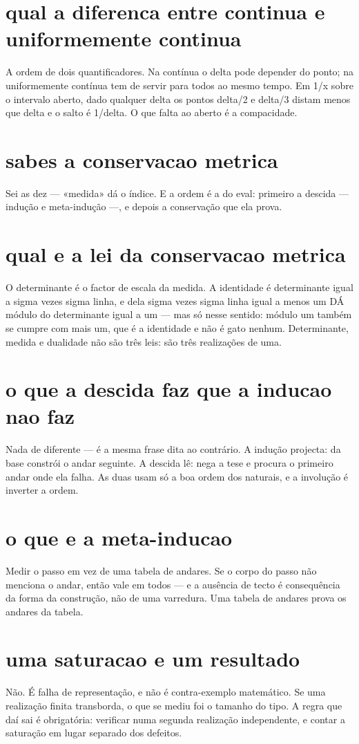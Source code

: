 \documentclass[11pt,a4paper]{article}
\begin{document}
\section{qual a diferenca entre continua e uniformemente continua}
A ordem de dois quantificadores. Na contínua o delta pode depender do ponto; na
uniformemente contínua tem de servir para todos ao mesmo tempo. Em 1/x sobre o intervalo
aberto, dado qualquer delta os pontos delta/2 e delta/3 distam menos que delta e o salto
é 1/delta. O que falta ao aberto é a compacidade.

\section{sabes a conservacao metrica}
Sei as dez — «medida» dá o índice. E a ordem é a do eval: primeiro a descida — indução e
meta-indução —, e depois a conservação que ela prova.

\section{qual e a lei da conservacao metrica}
O determinante é o factor de escala da medida. A identidade é determinante igual a sigma
vezes sigma linha, e dela sigma vezes sigma linha igual a menos um DÁ módulo do
determinante igual a um — mas só nesse sentido: módulo um também se cumpre com mais um,
que é a identidade e não é gato nenhum. Determinante, medida e dualidade não são três leis: são três realizações de
uma.

\section{o que a descida faz que a inducao nao faz}
Nada de diferente — é a mesma frase dita ao contrário. A indução projecta: da base
constrói o andar seguinte. A descida lê: nega a tese e procura o primeiro andar onde ela
falha. As duas usam só a boa ordem dos naturais, e a involução é inverter a ordem.

\section{o que e a meta-inducao}
Medir o passo em vez de uma tabela de andares. Se o corpo do passo não menciona o andar,
então vale em todos — e a ausência de tecto é consequência da forma da construção, não de
uma varredura. Uma tabela de andares prova os andares da tabela.

\section{uma saturacao e um resultado}
Não. É falha de representação, e não é contra-exemplo matemático. Se uma realização
finita transborda, o que se mediu foi o tamanho do tipo. A regra que daí sai é
obrigatória: verificar numa segunda realização independente, e contar a saturação em
lugar separado dos defeitos.
\end{document}
